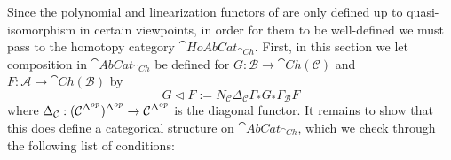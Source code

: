 Since the polynomial and linearization functors of \cite{JohnsonB.2004Dcwc} are only defined up to quasi-isomorphism in certain viewpoints, in order for them to be well-defined we must pass to the homotopy category $\cat{HoAbCat}_{\cat{Ch}}$. First, in this section we let composition in $\cat{AbCat}_{\cat{Ch}}$ be defined for $G:\mathcal{B}\rightarrow \cat{Ch}(\mathcal{C})$ and $F:\mathcal{A}\rightarrow \cat{Ch}(\mathcal{B})$ by
\begin{equation*}
    G\lhd F := N_\mathcal{C}\Delta_\mathcal{C}\Gamma_* G_*\Gamma_\mathcal{B} F
\end{equation*}
where $\Delta_\mathcal{C}:(\mathcal{C}^{\Delta^{op}})^{\Delta^{op}}\rightarrow \mathcal{C}^{\Delta^{op}}$ is the diagonal functor. It remains to show that this does define a categorical structure on $\cat{AbCat}_{\cat{Ch}}$, which we check through the following list of conditions:
